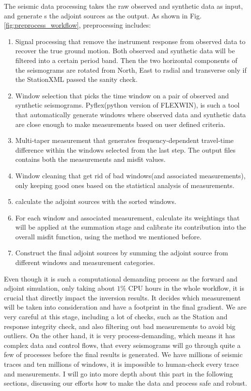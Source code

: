\documentclass[extra,mreferee]{gji}
\begin{document}
The seismic data processing takes the raw observed and synthetic data as input,
and generate s the adjoint sources as the output. As shown
in Fig.\ref{fig:preprocess_workflow}, preprocessing includes:
\begin{enumerate}
  \item Signal processing that remove the instrument response from observed data
    to recover the true ground motion. Both observed and synthetic data will be
    filtered into a certain period band. Then the two horizontal components of the
    seismograms are rotated from North, East to radial and transverse only if the
    StationXML passed the sanity check.
  \item Window selection that picks the time window on a pair of
    observed and synthetic seismograms. Pyflex(python version
    of FLEXWIN\citep{maggi2009automated}), is
    such a tool that automatically generate windows where observed data and
    synthetic data are close enough to make measurements based on user defined
    criteria.
  \item Multi-taper measurement that generates frequency-dependent travel-time
    difference within the windows selected from the last step.
    The output files contains both the measurements and misfit values.
  \item Window cleaning that get rid of bad windows(and associated
    measurements), only keeping good ones based on the statistical analysis of
    measurements.
  \item calculate the adjoint sources with the sorted windows.
  \item For each window and associated measurement, calculate its weightings
    that will be applied at the summation stage and calibrate its contribution
    into the overall misfit function, using the method we mentioned before.
  \item Construct the final adjoint sources by summing the adjoint source from
    different windows and measurement categories.
\end{enumerate}

Even though it is such a computational demanding process as the forward and adjoint
simulation, only taking about $1\%$ CPU hours in the whole workflow, it is crucial
that directly impact the inversion results. It decides which measurement
will be taken into consideration and have a footprint in the final gradient.
We are very careful at this stage, including a lot of checks, such as the Station and
response integrity check, and also filtering out bad measurements to avoid big outliers.
On the other hand, it is very process-demanding, which means it has complex data and
control flows, that every seismograms will go through quite a few of processes
before the final results is generated. We have millions of seismic traces and ten
millions of windows, it is impossible to human-check every trace and measurements.
I will go into more depth about this part in the following sections, discussing our
efforts how to make the data and process safe and robust.
\end{document}
